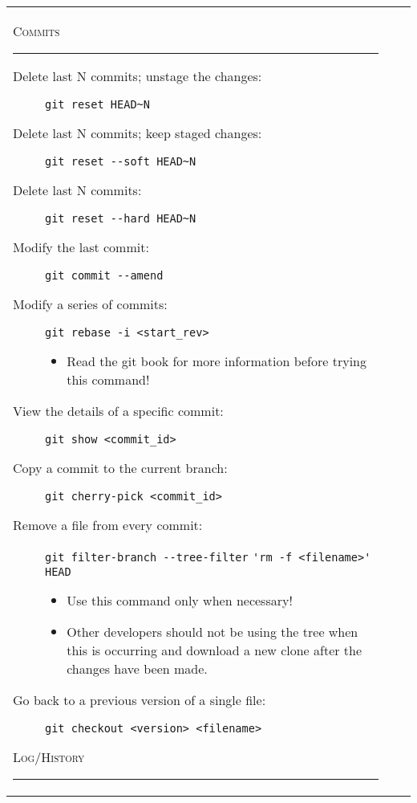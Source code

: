 \documentclass[landscape]{article}
\begin{document}
\begin{tabular*}{10.5in}{|p{2.9in}|p{2.9in}|p{2.9in}|}
    \begin{flushleft}
        \textsc{Commits}
        \rule{2.9in}{.5pt}
        \small
        \begin{description}
            \item[Delete last N commits; unstage the changes:]
                {\verb!git reset HEAD~N!}
            \item[Delete last N commits; keep staged changes:]
                {\verb!git reset --soft HEAD~N!}
            \item[Delete last N commits:]
                {\verb!git reset --hard HEAD~N!}
            \item[Modify the last commit:]
                {\verb!git commit --amend!}
            \item[Modify a series of commits:]
                {\verb!git rebase -i <start_rev>!}
                \begin{itemize}
                    \item{Read the git book for more information before trying
                        this command!}
                \end{itemize}
            \item[View the details of a specific commit:]
                {\verb!git show <commit_id>!}
            \item[Copy a commit to the current branch:]
                {\verb!git cherry-pick <commit_id>!}
            \item[Remove a file from every commit:]
                {\verb!git filter-branch --tree-filter!
                 \verb!'rm -f <filename>' HEAD!}
                \begin{itemize}
                    \item{Use this command only when necessary!}
                    \item{Other developers should not be using the tree when
                        this is occurring and download a new clone after the
                        changes have been made.}
                \end{itemize}
            \item[Go back to a previous version of a single file:]
                {\verb!git checkout <version> <filename>!}
        \end{description}
        \textsc{Log/History}
        \rule{2.9in}{.5pt}
        \small
        \begin{description}

\end{description}
\end{flushleft}
\end{tabular*}
\end{document}
